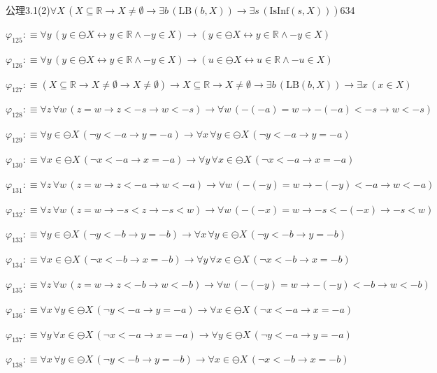 \begin{fullproof}{公理3.1(2)}{$\forall X\,(X \subseteq \mathbb{R} \to X \neq \emptyset \to \exists b\,(\mathrm{LB}(b,X)) \to \exists s\,(\mathrm{IsInf}(s,X)))$}{634}
\begin{abbrevlist}
\item $\varphi_{125} :\equiv \forall y\,(y \in \ominus X \leftrightarrow y \in \mathbb{R} \land -y \in X) \to (y \in \ominus X \leftrightarrow y \in \mathbb{R} \land -y \in X)$
\item $\varphi_{126} :\equiv \forall y\,(y \in \ominus X \leftrightarrow y \in \mathbb{R} \land -y \in X) \to (u \in \ominus X \leftrightarrow u \in \mathbb{R} \land -u \in X)$
\item $\varphi_{127} :\equiv (X \subseteq \mathbb{R} \to X \neq \emptyset \to X \neq \emptyset) \to X \subseteq \mathbb{R} \to X \neq \emptyset \to \exists b\,(\mathrm{LB}(b,X)) \to \exists x\,(x \in X)$
\item $\varphi_{128} :\equiv \forall z\,\forall w\,(z = w \to z < -s \to w < -s) \to \forall w\,(-(-a) = w \to -(-a) < -s \to w < -s)$
\item $\varphi_{129} :\equiv \forall y \in \ominus X\,(\neg y < -a \to y = -a) \to \forall x\,\forall y \in \ominus X\,(\neg y < -a \to y = -a)$
\item $\varphi_{130} :\equiv \forall x \in \ominus X\,(\neg x < -a \to x = -a) \to \forall y\,\forall x \in \ominus X\,(\neg x < -a \to x = -a)$
\item $\varphi_{131} :\equiv \forall z\,\forall w\,(z = w \to z < -a \to w < -a) \to \forall w\,(-(-y) = w \to -(-y) < -a \to w < -a)$
\item $\varphi_{132} :\equiv \forall z\,\forall w\,(z = w \to -s < z \to -s < w) \to \forall w\,(-(-x) = w \to -s < -(-x) \to -s < w)$
\item $\varphi_{133} :\equiv \forall y \in \ominus X\,(\neg y < -b \to y = -b) \to \forall x\,\forall y \in \ominus X\,(\neg y < -b \to y = -b)$
\item $\varphi_{134} :\equiv \forall x \in \ominus X\,(\neg x < -b \to x = -b) \to \forall y\,\forall x \in \ominus X\,(\neg x < -b \to x = -b)$
\item $\varphi_{135} :\equiv \forall z\,\forall w\,(z = w \to z < -b \to w < -b) \to \forall w\,(-(-y) = w \to -(-y) < -b \to w < -b)$
\item $\varphi_{136} :\equiv \forall x\,\forall y \in \ominus X\,(\neg y < -a \to y = -a) \to \forall x \in \ominus X\,(\neg x < -a \to x = -a)$
\item $\varphi_{137} :\equiv \forall y\,\forall x \in \ominus X\,(\neg x < -a \to x = -a) \to \forall y \in \ominus X\,(\neg y < -a \to y = -a)$
\item $\varphi_{138} :\equiv \forall x\,\forall y \in \ominus X\,(\neg y < -b \to y = -b) \to \forall x \in \ominus X\,(\neg x < -b \to x = -b)$

\end{abbrevlist}
\end{fullproof}
